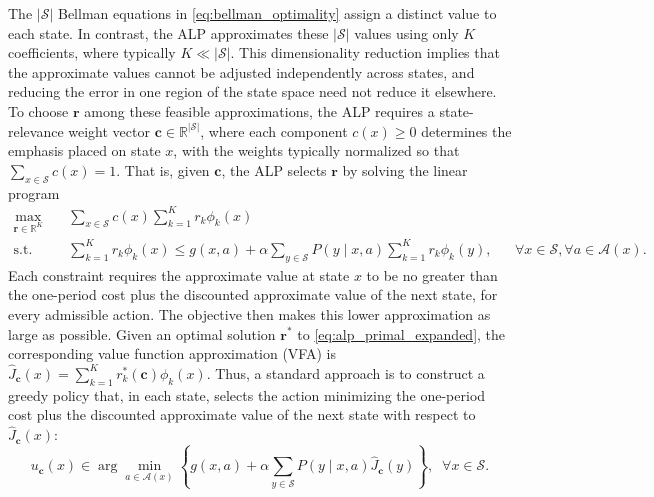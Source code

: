 \documentclass[sglanonrev]{informs4}
\providecommand{\bc}{\boldsymbol{c}}
\providecommand{\br}{\boldsymbol{r}}
\def\edits#1{{\color{black}#1}}
\begin{document}
\edits{The $|\mathcal S|$ Bellman equations in \eqref{eq:bellman_optimality} assign a distinct value to each state. In contrast, the \ac{ALP} approximates these $|\mathcal S|$ values using only $K$ coefficients, where typically $K\ll|\mathcal S|$.} This dimensionality reduction implies that the approximate values cannot be adjusted independently across states, and reducing the error in one region of the state space need not reduce it elsewhere. To choose $\br$ among these feasible approximations, the \ac{ALP} requires a state-relevance weight vector $\bc\in\mathbb R^{|\mathcal S|}$, where each component $c(x)\geq 0$
determines the emphasis placed on state $x$, with the weights typically
normalized so that $\sum_{x\in\mathcal S}c(x)=1$. That is, given $\bc$, the
\ac{ALP} selects $\br$ by solving the linear program
\begin{equation}
\label{eq:alp_primal_expanded}
\tag{pALP}
\begin{aligned}
\max_{\br\in\mathbb R^K}\quad
&
\sum_{x\in\mathcal S}c(x)
\sum_{k=1}^K r_k\phi_k(x) \\
\text{s.t.}\quad
&
\sum_{k=1}^K r_k\phi_k(x)
\leq
g(x,a)
+
\alpha\sum_{y\in\mathcal S}P(y\mid x,a)
\sum_{k=1}^K r_k\phi_k(y),
&& \forall x\in\mathcal S, \forall a \in \mathcal A(x).
\end{aligned}
\end{equation}
Each constraint requires the approximate value at state $x$ to be no greater than the one-period cost plus the discounted approximate value of the next state, for every admissible action. The objective then makes this lower approximation as large as possible. 
\edits{Given an optimal solution $\br^*$ to \eqref{eq:alp_primal_expanded}, the corresponding value function approximation (VFA) is $\widehat J_{\bc}(x) = \sum_{k=1}^K r^*_k(\bc)\phi_k(x)$. Thus, a standard approach is to construct a greedy policy that, in each state, selects the action minimizing the one-period cost plus the discounted approximate value of the next state with respect to $\widehat J_{\bc}(x)$:}
\begin{equation}
\label{eq:greedy_policy_from_alp}
u_{\bc}(x)
\in
\arg\min_{a\in\mathcal A(x)}
\left\{
g(x,a)
+
\alpha\sum_{y\in\mathcal S}
P(y\mid x,a)\widehat J_{\bc}(y)
\right\},
\;\; \forall x\in\mathcal S.
\end{equation}
\end{document}
